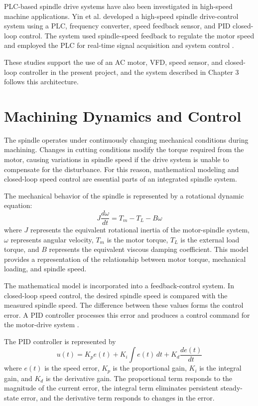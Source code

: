 \documentclass[12pt,a4paper]{report}
\begin{document}
	PLC-based spindle drive systems have also been investigated in high-speed machine applications. Yin et al. developed a high-speed spindle drive-control system using a PLC, frequency converter, speed feedback sensor, and PID closed-loop control. The system used spindle-speed feedback to regulate the motor speed and employed the PLC for real-time signal acquisition and system control \cite{ref17}.
	
	These studies support the use of an AC motor, VFD, speed sensor, and closed-loop controller in the present project, and the system described in Chapter 3 follows this architecture.
	
	\section{Machining Dynamics and Control}
	The spindle operates under continuously changing mechanical conditions during machining. Changes in cutting conditions modify the torque required from the motor, causing variations in spindle speed if the drive system is unable to compensate for the disturbance. For this reason, mathematical modeling and closed-loop speed control are essential parts of an integrated spindle system.
	
	The mechanical behavior of the spindle is represented by a rotational dynamic equation:
	\begin{equation}
		J\frac{d\omega}{dt}=T_m-T_L-B\omega
	\end{equation}
	where $J$ represents the equivalent rotational inertia of the motor-spindle system, $\omega$ represents angular velocity, $T_m$ is the motor torque, $T_L$ is the external load torque, and $B$ represents the equivalent viscous damping coefficient. This model provides a representation of the relationship between motor torque, mechanical loading, and spindle speed.
	
	The mathematical model is incorporated into a feedback-control system. In closed-loop speed control, the desired spindle speed is compared with the measured spindle speed. The difference between these values forms the control error. A PID controller processes this error and produces a control command for the motor-drive system \cite{ref9}.
	
	The PID controller is represented by
	\begin{equation}
		u(t)=K_pe(t)+K_i\int e(t)\,dt+K_d\frac{de(t)}{dt}
	\end{equation}
	where $e(t)$ is the speed error, $K_p$ is the proportional gain, $K_i$ is the integral gain, and $K_d$ is the derivative gain. The proportional term responds to the magnitude of the current error, the integral term eliminates persistent steady-state error, and the derivative term responds to changes in the error.
	
\end{document}
